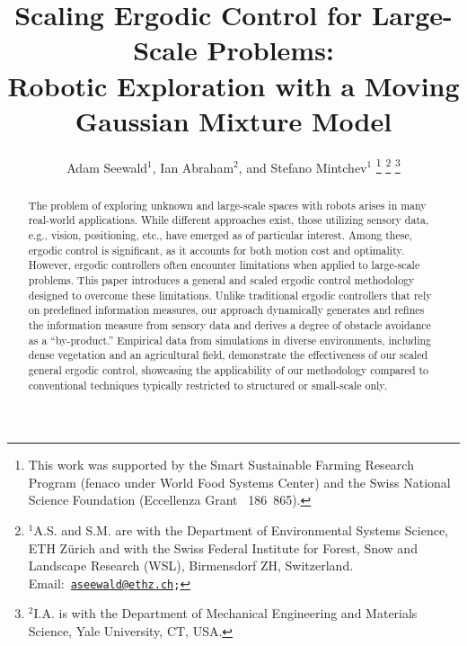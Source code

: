 \documentclass[letterpaper,10pt,conference,twoside]{IEEEtran}
\theoremstyle{definition}
\begin{document}

\title{\LARGE\bf Scaling Ergodic Control for Large-Scale Problems:\\Robotic Exploration with a Moving Gaussian Mixture Model}

\author{Adam Seewald${}^{\text{1}}$, Ian Abraham${}^{\text{2}}$, and Stefano Mintchev${}^{\text{1}}$
  \thanks{%
  This work was supported by the Smart Sustainable Farming Research Program (fenaco under World Food Systems Center) and the Swiss National Science Foundation (Eccellenza Grant \textnumero~186~865).}
  \thanks{${}^{\text{1}}$A.\hspace*{.4ex}S. and S.\hspace*{.4ex}M. are with the Department of Environmental Systems Science, ETH Z{\"u}rich and with the Swiss Federal Institute for Forest, Snow and Landscape Research (WSL), Birmensdorf ZH, Switzerland. Email:~{\tt\footnotesize \href{mailto:aseewald@ethz.ch}{aseewald@ethz.ch};}}
  \thanks{${}^{\text{2}}$I.\hspace*{.4ex}A. is with the Department of Mechanical Engineering and Materials Science, Yale University, CT, USA.}
}

\maketitle

\begin{abstract}
  The problem of exploring unknown and large-scale spaces with robots arises in many real-world applications. While different approaches exist, those utilizing sensory data, e.g., vision, positioning, etc., have emerged as of particular interest. Among these, ergodic control is significant, as it accounts for both motion cost and optimality. However, ergodic controllers often encounter limitations when applied to large-scale problems. This paper introduces a general and scaled ergodic control methodology designed to overcome these limitations. Unlike traditional ergodic controllers that rely on predefined information measures, our approach dynamically generates and refines the information measure from sensory data and derives a degree of obstacle avoidance as a ``by-product.'' Empirical data from simulations in diverse environments, including dense vegetation and an agricultural field, demonstrate the effectiveness of our scaled general ergodic control, showcasing the applicability of our methodology compared to conventional techniques typically restricted to structured or small-scale only.
\end{abstract}
\end{document}
